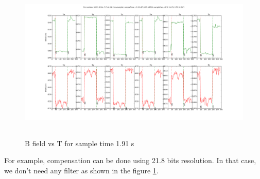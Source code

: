 \begin{figure}[t]
    \centering
    \captionsetup{justification=centering,margin=1cm}
    \includegraphics[height=3in, width=6in]{Figures/flux_r12.png}
    \caption{B field vs T for sample time 1.91 s\label{fig: fr12_1,2}}
\end{figure}
For example, compensation can be done using 21.8 bits resolution. In that case, we don't need any filter as shown in the figure \ref{fig: fr12_1,2}.

